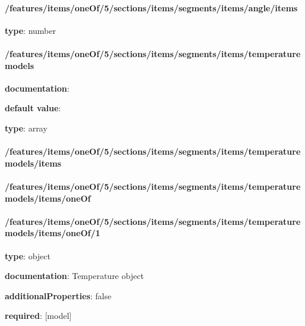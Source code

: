 \begin{itemized}
\paragraph{/features/items/oneOf/5/sections/items/segments/items/angle/items} \begin{itemized}
\item {\bf type}: number
\end{itemized}\end{itemized}\paragraph{/features/items/oneOf/5/sections/items/segments/items/temperature models} \begin{itemized}
\item {\bf documentation}: 
\item {\bf default value}: 
\item {\bf type}: array
\paragraph{/features/items/oneOf/5/sections/items/segments/items/temperature models/items} \begin{itemized}
\end{itemized}\end{itemized}\paragraph{/features/items/oneOf/5/sections/items/segments/items/temperature models/items/oneOf} \begin{itemized}
\end{itemized}\paragraph{/features/items/oneOf/5/sections/items/segments/items/temperature models/items/oneOf/1} \begin{itemized}
\item {\bf type}: object
\item {\bf documentation}: Temperature object
\item {\bf additionalProperties}: false
\item {\bf required}: [model]\end{itemized}
